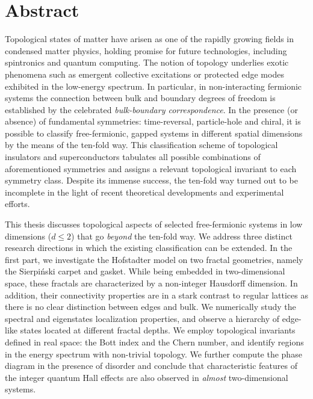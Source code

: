 \begingroup
\let\clearpage\relax
\let\cleardoublepage\relax
\let\cleardoublepage\relax

\chapter*{Abstract}
Topological states of matter have arisen as one of the rapidly growing fields in condensed matter physics, holding promise for future technologies, including spintronics and quantum computing. The notion of topology underlies exotic phenomena such as emergent collective excitations or protected edge modes exhibited in the low-energy spectrum. In particular, in non-interacting fermionic systems the connection between bulk and boundary degrees of freedom is established by the celebrated \emph{bulk-boundary correspondence}. In the presence (or absence) of fundamental symmetries: time-reversal, particle-hole and chiral, it is possible to classify free-fermionic, gapped systems in different spatial dimensions by the means of the ten-fold way. This classification scheme of topological insulators and superconductors tabulates all possible combinations of aforementioned symmetries and assigns a relevant topological invariant to each symmetry class. Despite its immense success, the ten-fold way turned out to be incomplete in the light of recent theoretical developments and experimental efforts.

This thesis discusses topological aspects of selected free-fermionic systems in low dimensions ($d \leq 2$) that go \emph{beyond} the ten-fold way. We address three distinct research directions in which the existing classification can be extended. In the first part, we investigate the Hofstadter model on two fractal geometries, namely the Sierpiński carpet and gasket. While being embedded in two-dimensional space, these fractals are characterized by a non-integer Hausdorff dimension. In addition, their connectivity properties are in a stark contrast to regular lattices as there is no clear distinction between edges and bulk. We numerically study the spectral and eigenstates localization properties, and observe a hierarchy of edge-like states located at different fractal depths. We employ topological invariants defined in real space: the Bott index and the Chern number, and identify regions in the energy spectrum with non-trivial topology. We further compute the phase diagram in the presence of disorder and conclude that characteristic features of the integer quantum Hall effects are also observed in \emph{almost} two-dimensional systems.

